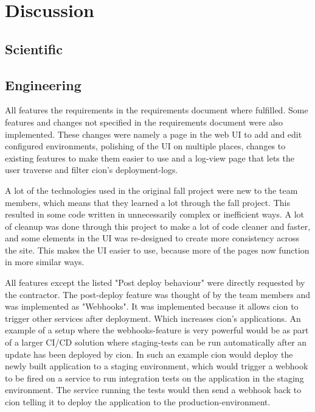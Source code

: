 \chapter{Discussion}
\label{chap:discussion}

\section{Scientific}

\section{Engineering}
All features the requirements in the requirements document where fulfilled. Some features and changes not specified in the requirements document were also implemented. These changes were namely a page in the web UI to add and edit configured environments, polishing of the UI on multiple places, changes to existing features to make them easier to use and a log-view page that lets the user traverse and filter cion's deployment-logs.

A lot of the technologies used in the original fall project were new to the team members, which means that they learned a lot through the fall project. This resulted in some code written in unnecessarily complex or inefficient ways. A lot of cleanup was done through this project to make a lot of code cleaner and faster, and some elements in the UI was re-designed to create more consistency across the site. This makes the UI easier to use, because more of the pages now function in more similar ways.

All features except the listed "Post deploy behaviour" were directly requested by the contractor. The post-deploy feature was thought of by the team members and was implemented as "Webhooks". It was implemented because it allows cion to trigger other services after deployment. Which increases cion's applications.
An example of a setup where the webhooks-feature is very powerful would be as part of a larger CI/CD solution where staging-tests can be run automatically after an update has been deployed by cion. 
In such an example cion would deploy the newly built application to a staging environment, which would trigger a webhook to be fired on a service to run integration tests on the application in the staging environment. The service running the tests would then send a webhook back to cion telling it to deploy the application to the production-environment.

